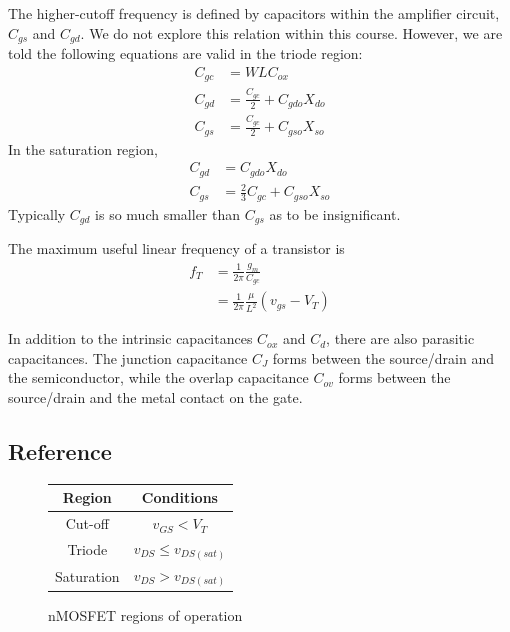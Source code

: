\documentclass[nobib]{tufte-handout}
\begin{document}
The higher-cutoff frequency is defined by capacitors within 
the amplifier circuit, $C_{gs}$ and $C_{gd}$. 
We do not explore this relation within this course.
However, we are told the following equations are 
valid in the triode region:
\begin{align} \label{eq:35}
    C_{gc} &= WLC_{ox} \\
    C_{gd} &= \frac{C_{gc}}{2} + C_{gdo} X_{do} \\
    C_{gs} &= \frac{C_{gc}}{2} + C_{gso} X_{so}
\end{align}
In the saturation region, 
\begin{align} \label{eq:36}
    C_{gd} &= C_{gdo}X_{do} \\
    C_{gs} &= \frac{2}{3}C_{gc} + C_{gso}X_{so}
\end{align}
Typically $C_{gd}$ is so much smaller than $C_{gs}$
as to be insignificant. 

The maximum useful linear frequency of 
a transistor is
\begin{align} \label{eq:37}
    f_T &= \frac{1}{2\pi} \frac{g_m}{C_{gc}} \\
    &= \frac{1}{2\pi} \frac{\mu}{L^2} (v_{gs} - V_T)
\end{align}

In addition to the intrinsic capacitances $C_{ox}$
and $C_d$, there are also parasitic capacitances. 
The junction capacitance $C_J$ forms between the 
source/drain and the semiconductor, while the 
overlap capacitance $C_{ov}$ forms between the 
source/drain and the metal contact on the gate. 

\subsection{Reference}

\begin{figure}
    \begin{center}
        \begin{tabular}{ c | c }
            Region & Conditions \\
            \hline
            Cut-off & $v_{GS} < V_T$ \\
            Triode & $v_{DS} \leq v_{DS(sat)}$ \\
            Saturation & $v_{DS} > v_{DS(sat)}$ \\
            \hline
        \end{tabular}
    \end{center}
    \caption{nMOSFET regions of operation}
    \label{tab:nMOSFET regions}
\end{figure}
\end{document}
